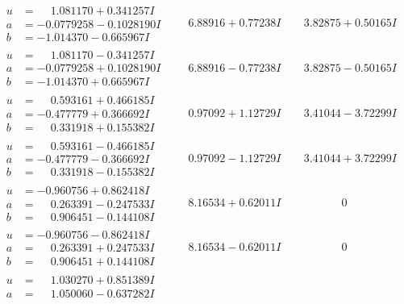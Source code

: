 \documentclass[1p]{elsarticle_modified}
\theoremstyle{definition}
\begin{document}
$$\begin{array}{c|c|c}
\begin{aligned}
u &= \phantom{-}1.081170 + 0.341257 I \\
a &= -0.0779258 - 0.1028190 I \\
b &= -1.014370 - 0.665967 I\end{aligned}
 & \phantom{-}6.88916 + 0.77238 I & \phantom{-}3.82875 + 0.50165 I \\ \hline\begin{aligned}
u &= \phantom{-}1.081170 - 0.341257 I \\
a &= -0.0779258 + 0.1028190 I \\
b &= -1.014370 + 0.665967 I\end{aligned}
 & \phantom{-}6.88916 - 0.77238 I & \phantom{-}3.82875 - 0.50165 I \\ \hline\begin{aligned}
u &= \phantom{-}0.593161 + 0.466185 I \\
a &= -0.477779 + 0.366692 I \\
b &= \phantom{-}0.331918 + 0.155382 I\end{aligned}
 & \phantom{-}0.97092 + 1.12729 I & \phantom{-}3.41044 - 3.72299 I \\ \hline\begin{aligned}
u &= \phantom{-}0.593161 - 0.466185 I \\
a &= -0.477779 - 0.366692 I \\
b &= \phantom{-}0.331918 - 0.155382 I\end{aligned}
 & \phantom{-}0.97092 - 1.12729 I & \phantom{-}3.41044 + 3.72299 I \\ \hline\begin{aligned}
u &= -0.960756 + 0.862418 I \\
a &= \phantom{-}0.263391 - 0.247533 I \\
b &= \phantom{-}0.906451 - 0.144108 I\end{aligned}
 & \phantom{-}8.16534 + 0.62011 I & \phantom{-0.000000 } 0 \\ \hline\begin{aligned}
u &= -0.960756 - 0.862418 I \\
a &= \phantom{-}0.263391 + 0.247533 I \\
b &= \phantom{-}0.906451 + 0.144108 I\end{aligned}
 & \phantom{-}8.16534 - 0.62011 I & \phantom{-0.000000 } 0 \\ \hline\begin{aligned}
u &= \phantom{-}1.030270 + 0.851389 I \\
a &= \phantom{-}1.050060 - 0.637282 I \\

\end{aligned}
\end{array}$$
\end{document}
